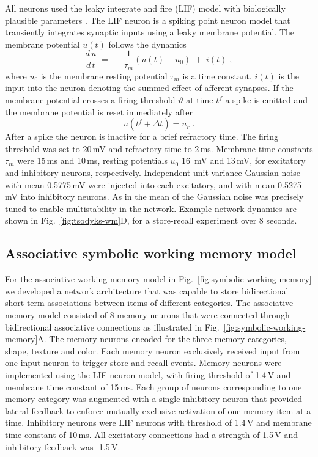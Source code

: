 All neurons used the leaky integrate and fire (LIF) model with biologically plausible parameters \cite{gerstner2014neuronal}. The LIF neuron is a spiking point neuron model that transiently integrates synaptic inputs using a leaky membrane potential. The membrane potential $u(t)$ follows the dynamics
\begin{equation}
\frac{d\,u}{d\,t}  \;=\; - \frac{1}{\tau_m} \left(u(t) - u_0 \right) \;+\; i(t)\;,
\label{eq:membrane-potential}
\end{equation}
where $u_0$ is the membrane resting potential $\tau_m$ is a time constant. $i(t)$ is the input into the neuron denoting the summed effect of afferent synapses. If the membrane potential crosses a firing threshold $\vartheta$ at time $t^f$ a spike is emitted and the membrane potential is reset immediately after
\begin{equation}
 u(t^f+\Delta t) = u_r\;.
 \label{eq:reset_behavior}
\end{equation}
After a spike the neuron is inactive for a brief refractory time. The firing threshold was set to 20\,mV and refractory time to 2\,ms. Membrane time constants $\tau_m$ were 15\,ms and 10\,ms, resting potentials $u_0$ 16~mV and 13\,mV, for excitatory and inhibitory neurons, respectively. Independent unit variance Gaussian noise with mean 0.5775\,mV were injected into each excitatory, and with mean 0.5275\,mV into inhibitory neurons. As in \cite{mongillo2008synaptic} the mean of the Gaussian noise was precisely tuned to enable multistability in the network. Example network dynamics are shown in Fig.~\ref{fig:tsodyks-wm}D, for a store-recall experiment over 8 seconds.

\subsection{Associative symbolic working memory model}
\label{sec:associative-memory}

For the associative working memory model in Fig.~\ref{fig:symbolic-working-memory} we developed a network architecture that was capable to store bidirectional short-term associations between items of different categories. The associative memory model consisted of 8 memory neurons that were connected through bidirectional associative connections as illustrated in Fig.~\ref{fig:symbolic-working-memory}A. The memory neurons encoded for the three memory categories, shape, texture and color. Each memory neuron exclusively received input from one input neuron to trigger store and recall events. Memory neurons were implemented using the LIF neuron model, with firing threshold of 1.4\,V and membrane time constant of 15\,ms. Each group of neurons corresponding to one memory category was augmented with a single inhibitory neuron that provided lateral feedback to enforce mutually exclusive activation of one memory item at a time. Inhibitory neurons were LIF neurons with threshold of 1.4\,V and membrane time constant of 10\,ms. All excitatory connections had a strength of 1.5\,V and inhibitory feedback was -1.5\,V.

